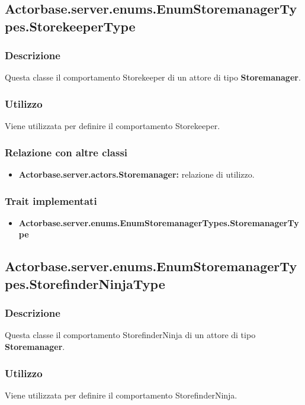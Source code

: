 \documentclass[a4paper]{article}
\begin{document}
						\subsection{Actorbase.server.enums.EnumStoremanagerTypes.StorekeeperType}
			\subsubsection{Descrizione}
				Questa classe il comportamento Storekeeper di un attore di tipo \textbf{Storemanager}.
				
			\subsubsection{Utilizzo}
				Viene utilizzata per definire il comportamento Storekeeper.
				
			\subsubsection{Relazione con altre classi}
				\begin{itemize}
					\item \textbf{Actorbase.server.actors.Storemanager:} relazione di utilizzo.
				\end{itemize}
		
			\subsubsection{Trait implementati}
				\begin{itemize}
					\item \textbf{Actorbase.server.enums.EnumStoremanagerTypes.StoremanagerType} 
				\end{itemize}
				
						\subsection{Actorbase.server.enums.EnumStoremanagerTypes.StorefinderNinjaType}
			\subsubsection{Descrizione}
				Questa classe il comportamento StorefinderNinja di un attore di tipo \textbf{Storemanager}.
				
			\subsubsection{Utilizzo}
				Viene utilizzata per definire il comportamento StorefinderNinja.
				
\end{document}
